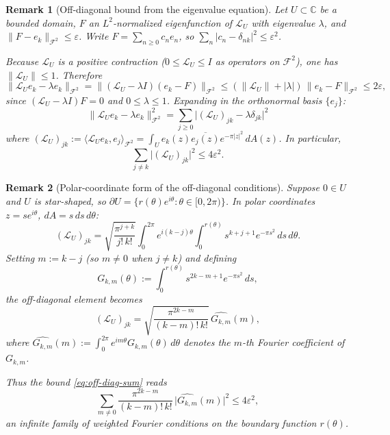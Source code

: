 \documentclass[a4paper,11pt,reqno]{amsart}
\newtheorem{remark}{Remark}[section]
\begin{document}
\begin{remark}[Off-diagonal bound from the eigenvalue equation]
\label{rem:off-diag}
Let $U\subset\mathbb{C}$ be a bounded domain, $F$ an $L^2$-normalized eigenfunction of $\mathcal{L}_U$
with eigenvalue $\lambda$, and $\|F-e_k\|_{\mathcal{F}^2}\le\varepsilon$.
Write $F=\sum_{n\ge0}c_n e_n$, so $\sum_n|c_n-\delta_{nk}|^2\le\varepsilon^2$.

Because $\mathcal{L}_U$ is a positive contraction ($0\le\mathcal{L}_U\le I$ as operators
on $\mathcal{F}^2$), one has $\|\mathcal{L}_U\|\le1$. Therefore
\[
\|\mathcal{L}_Ue_k-\lambda e_k\|_{\mathcal{F}^2}
=\|(\mathcal{L}_U-\lambda I)(e_k-F)\|_{\mathcal{F}^2}
\le (\|\mathcal{L}_U\|+|\lambda|)\,\|e_k-F\|_{\mathcal{F}^2}
\le 2\varepsilon,
\]
since $(\mathcal{L}_U-\lambda I)F=0$ and $0\le\lambda\le1$.
Expanding in the orthonormal basis $\{e_j\}$:
\[
\|\mathcal{L}_Ue_k-\lambda e_k\|_{\mathcal{F}^2}^2
=\sum_{j\ge0}\bigl|(\mathcal{L}_U)_{jk}-\lambda\delta_{jk}\bigr|^2
\]
where $(\mathcal{L}_U)_{jk}:=\langle\mathcal{L}_Ue_k,e_j\rangle_{\mathcal{F}^2}
=\int_U e_k(z)\overline{e_j(z)}e^{-\pi|z|^2}\,dA(z)$.
In particular,
\begin{equation}\label{eq:off-diag-sum}
\sum_{j\neq k}\bigl|(\mathcal{L}_U)_{jk}\bigr|^2\le4\varepsilon^2.
\end{equation}
\end{remark}

\begin{remark}[Polar-coordinate form of the off-diagonal conditions]
\label{rem:polar-moments}
Suppose $0\in U$ and $U$ is star-shaped, so $\partial U=\{r(\theta)e^{i\theta}:\theta\in[0,2\pi)\}$.
In polar coordinates $z=se^{i\theta}$, $dA=s\,ds\,d\theta$:
\[
(\mathcal{L}_U)_{jk}
=\sqrt{\frac{\pi^{j+k}}{j!\,k!}}\int_0^{2\pi}\!\!e^{i(k-j)\theta}
\!\!\int_0^{r(\theta)}\!\!s^{k+j+1}e^{-\pi s^2}\,ds\,d\theta.
\]
Setting $m:=k-j$ (so $m\neq0$ when $j\neq k$) and defining
\[
G_{k,m}(\theta):=\int_0^{r(\theta)}s^{2k-m+1}e^{-\pi s^2}\,ds,
\]
the off-diagonal element becomes
\[
(\mathcal{L}_U)_{jk}=\sqrt{\frac{\pi^{2k-m}}{(k-m)!\,k!}}\,\widehat{G_{k,m}}(m),
\]
where $\widehat{G_{k,m}}(m):=\int_0^{2\pi}e^{im\theta}G_{k,m}(\theta)\,d\theta$
denotes the $m$-th Fourier coefficient of $G_{k,m}$.

Thus the bound \eqref{eq:off-diag-sum} reads
\begin{equation}\label{eq:fourier-sum}
\sum_{m\neq0}\frac{\pi^{2k-m}}{(k-m)!\,k!}\,\bigl|\widehat{G_{k,m}}(m)\bigr|^2\le4\varepsilon^2,
\end{equation}
an infinite family of weighted Fourier conditions on the boundary function $r(\theta)$.
\end{remark}
\end{document}

